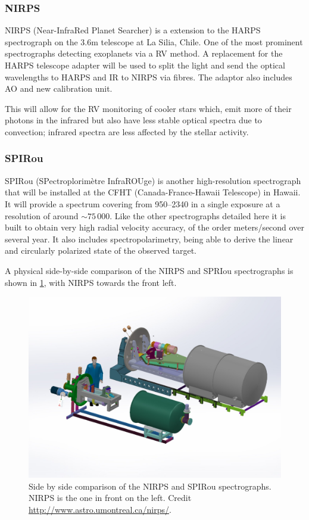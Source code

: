 \subsubsection{NIRPS}
{NIRPS} (Near-InfraRed Planet Searcher) is a \nir{} extension to the HARPS spectrograph on the 3.6\si{\metre} telescope at La Silia, Chile. One of the most prominent spectrographs detecting exoplanets via a RV method. A replacement for the HARPS telescope adapter will be used to split the light and send the optical wavelengths to HARPS and IR to NIRPS via fibres. The adaptor also includes AO and new calibration unit. 

This will allow for the RV monitoring of cooler stars which, emit more of their photons in the infrared but also have less stable optical spectra due to convection; infrared spectra are less affected by the stellar activity.

\subsubsection{SPIRou}
{SPIRou} (SPectroplorim\`etre InfraROUge) is another high-resolution \nir{} spectrograph that will be installed at the CFHT (Canada-France-Hawaii Telescope) in Hawaii.
It will provide a spectrum covering from 950--2340\nm{} in a single exposure at a resolution of around \(\sim75\,000\). Like the other spectrographs detailed here it is built to obtain very high radial velocity accuracy, of the order meters/second over several year. It also includes spectropolarimetry, being able to derive the linear and circularly polarized state of the observed target.

A physical side-by-side comparison of the {NIRPS} and {SPRIou} spectrographs is shown in \cref{fig:nirps-vs-spirou}, with {NIRPS} towards the front left.
\begin{figure}
    \centering
    \includegraphics[width=0.7\linewidth]{figures/spectroscopy/NIRPS-vs-SPIROU}
    \caption{Side by side comparison of the {NIRPS} and {SPIRou} spectrographs. {NIRPS} is the one in front on the left. Credit \href{http://www.astro.umontreal.ca/nirps/}{http://www.astro.umontreal.ca/nirps/}.}
    \label{fig:nirps-vs-spirou}
\end{figure}
